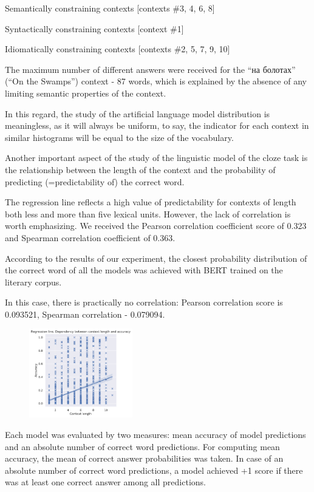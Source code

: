 \documentclass[a4paper]{article}
\begin{document}
Semantically constraining contexts [contexts \#3, 4, 6, 8]

Syntactically constraining contexts [context \#1]

Idiomatically constraining contexts [contexts \#2, 5, 7, 9, 10]
\newline

The maximum number of different answers were received for the “на болотах” (“On the Swamps”) context - 87 words, which is explained by the absence of any limiting semantic properties of the context.

In this regard, the study of the artificial language model distribution is meaningless, as it will always be uniform, to say, the indicator for each context in similar histograms will be equal to the size of the vocabulary.

Another important aspect of the study of the linguistic model of the cloze task is the relationship between the length of the context and the probability of predicting (=predictability of) the correct word.

The regression line reflects a high value of predictability for contexts of length both less and more than five lexical units. However, the lack of correlation is worth emphasizing. We received the Pearson correlation coefficient score of 0.323 and Spearman correlation coefficient of 0.363.

According to the results of our experiment, the closest probability distribution of the correct word of all the models was achieved with BERT trained on the literary corpus.

In this case, there is practically no correlation: Pearson correlation score is 0.093521, Spearman correlation - 0.079094.

\begin{figure}
\label{fig:context-accuracy-regression}
\centering
\includegraphics[width=0.4\textwidth]{figures/pdf/context-accuracy-regression.pdf}
\end{figure}


Each model was evaluated by two measures: mean accuracy of model predictions and an absolute number of correct word predictions. For computing mean accuracy, the mean of correct answer probabilities was taken. In case of an absolute number of correct word predictions, a model achieved +1 score if there was at least one correct answer among all predictions.
\end{document}
